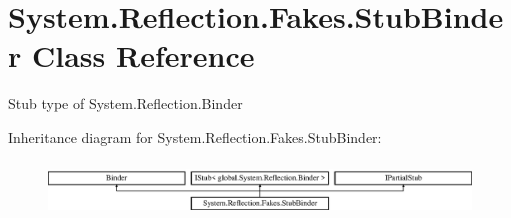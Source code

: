 \hypertarget{class_system_1_1_reflection_1_1_fakes_1_1_stub_binder}{\section{System.\-Reflection.\-Fakes.\-Stub\-Binder Class Reference}
\label{class_system_1_1_reflection_1_1_fakes_1_1_stub_binder}
}


Stub type of System.\-Reflection.\-Binder 


Inheritance diagram for System.\-Reflection.\-Fakes.\-Stub\-Binder\-:\begin{figure}[H]
\begin{center}
\leavevmode
\includegraphics[height=1.487384cm]{class_system_1_1_reflection_1_1_fakes_1_1_stub_binder}
\end{center}
\end{figure}
